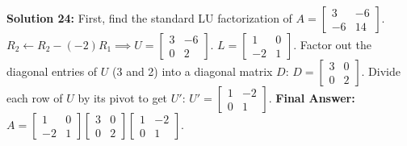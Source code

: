 \documentclass[11pt]{article}
\begin{document}
\textbf{Solution 24:}
First, find the standard LU factorization of $A = \begin{bmatrix} 3 & -6 \\ -6 & 14 \end{bmatrix}$.
$R_2 \leftarrow R_2 - (-2)R_1 \implies U = \begin{bmatrix} 3 & -6 \\ 0 & 2 \end{bmatrix}$. $L = \begin{bmatrix} 1 & 0 \\ -2 & 1 \end{bmatrix}$.
Factor out the diagonal entries of $U$ (3 and 2) into a diagonal matrix $D$:
$D = \begin{bmatrix} 3 & 0 \\ 0 & 2 \end{bmatrix}$.
Divide each row of $U$ by its pivot to get $U'$:
$U' = \begin{bmatrix} 1 & -2 \\ 0 & 1 \end{bmatrix}$.
\textbf{Final Answer:} $A = \begin{bmatrix} 1 & 0 \\ -2 & 1 \end{bmatrix} \begin{bmatrix} 3 & 0 \\ 0 & 2 \end{bmatrix} \begin{bmatrix} 1 & -2 \\ 0 & 1 \end{bmatrix}$.
\end{document}
